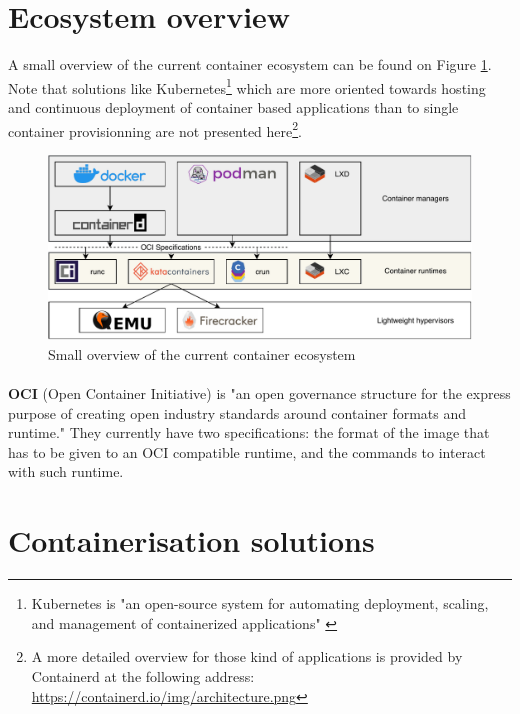 \section{Ecosystem overview}
A small overview of the current container ecosystem can be found on Figure \ref{fig:overview}.  Note that solutions like Kubernetes\footnote{Kubernetes is "an open-source system for automating deployment, scaling, and management of containerized applications" \cite{kubernetes}} which are more oriented towards hosting and continuous deployment of container based applications than to single container provisionning are not presented here\footnote{A more detailed overview for those kind of applications is provided by Containerd at the following address: \href{https://containerd.io/img/architecture.png}{https://containerd.io/img/architecture.png}}.
\begin{figure}[h!]
  \begin{center}
    \includegraphics[width=\linewidth]{images/ecosystem.pdf}
    \caption{Small overview of the current container ecosystem}
    \label{fig:overview}
  \end{center}
\end{figure}
\paragraph{}\textbf{OCI} (Open Container Initiative) is "an open governance structure for the express purpose of creating open industry standards around container formats and runtime."\cite{oci} They currently have two specifications: the format of the image that has to be given to an OCI compatible runtime, and the commands to interact with such runtime.

\section{Containerisation solutions}
